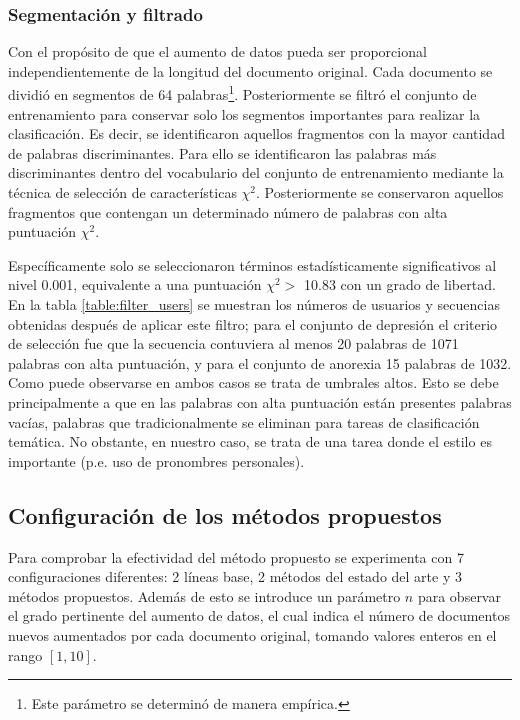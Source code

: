 \subsubsection{Segmentación y filtrado}
Con el propósito de que el aumento de datos pueda ser proporcional independientemente de la longitud del documento original. Cada documento se dividió en segmentos de 64 palabras\footnote{Este parámetro se determinó de manera empírica.}. Posteriormente se filtró el conjunto de entrenamiento para conservar solo los segmentos importantes para realizar la clasificación. Es decir, se identificaron aquellos fragmentos con la mayor cantidad de palabras discriminantes. Para ello se identificaron las  palabras más discriminantes dentro del vocabulario del conjunto de entrenamiento mediante la técnica de selección de características $\chi^2$. Posteriormente se conservaron aquellos fragmentos  que contengan un determinado número de palabras con alta puntuación $\chi^2$. 

Específicamente solo se seleccionaron términos estadísticamente significativos al nivel 0.001, equivalente a una puntuación $\chi^2 > $ 10.83 con un grado de libertad. En la tabla \ref{table:filter_users} se muestran los números de usuarios y secuencias obtenidas después de aplicar este filtro; para el conjunto de depresión el criterio de selección fue que la secuencia contuviera al menos 20 palabras de 1071 palabras con alta puntuación, y para el conjunto de anorexia 15 palabras de 1032. Como puede observarse en ambos casos se trata de umbrales altos. Esto se debe principalmente a que en las palabras con alta puntuación están presentes palabras vacías, palabras que tradicionalmente se eliminan para tareas de clasificación temática. No obstante, en nuestro caso,  se trata de una tarea donde el estilo es importante (p.e. uso de pronombres personales).



\subsection{Configuración de los métodos propuestos}

Para comprobar la efectividad del método propuesto se experimenta con  7 configuraciones diferentes: 2 líneas base, 2 métodos del estado del arte y 3 métodos propuestos. Además de esto se introduce un parámetro $n$ para observar el grado pertinente del aumento de datos, el cual indica el número de documentos nuevos aumentados por cada documento original, tomando valores enteros en el rango $[1,10]$.


